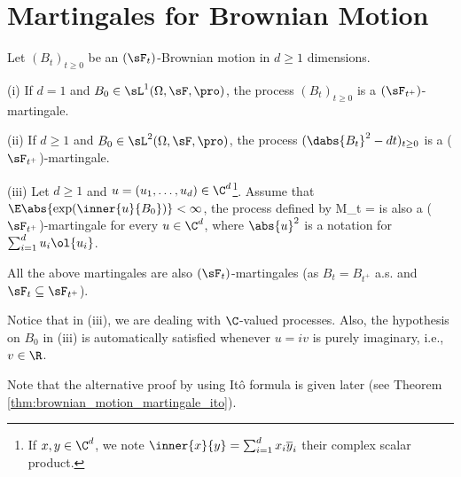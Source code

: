 \section{Martingales for Brownian Motion}

\begin{theorem}\label{thm:brownian_motion_martingale}
Let $(B_t)_{t \geq 0}$ be an $(\sF_t)$-Brownian motion in $d \geq 1$ dimensions.
\ben
\item [(i)] If $d = 1$ and $B_0 \in \sL^1(\Omega,\sF,\pro)$, the process $(B_t)_{t \geq 0}$ is a $(\sF_{t^+})$-martingale.
\item [(ii)] If $d \geq 1$ and $B_0 \in \sL^2(\Omega,\sF,\pro)$, the process $(\dabs{B_t}^2 - dt)_{ t \geq 0}$ is a ($\sF_{t^+}$)-martingale.
\item [(iii)] Let $d \geq 1$ and $u = (u_1,\dots, u_d) \in \C^d$\footnote{If $x, y \in \C^d$, we note $\inner{x}{y} = \sum^d_{i=1} x_i\overline{y}_i$ their complex scalar product.}. Assume that $\E\abs{\exp(\inner{u}{B_0})} < \infty$, the process defined by
\be
M_t = \exp{}
\ee
is also a ($\sF_{t^+}$)-martingale for every $u \in \C^d$, where $\abs{u}^2$ is a notation for $\sum^d_{i=1} u_i\ol{u_i}$.
\een
\end{theorem}

\begin{remark}
All the above martingales are also $(\sF_t)$-martingales (as $B_t = B_{t^+}$ a.s. and $\sF_{t}\subseteq \sF_{t^+}$).

Notice that in (iii), we are dealing with $\C$-valued processes. Also, the hypothesis on $B_0$ in (iii) is automatically satisfied whenever $u = iv$ is purely imaginary, i.e., $v \in \R$.

Note that the alternative proof by using It\^o formula is given later (see Theorem \ref{thm:brownian_motion_martingale_ito}).%
\end{remark}

